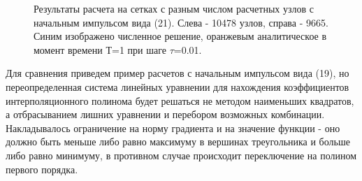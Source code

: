 \documentclass[14pt]{article}
\begin{document}
\begin{figure}[H]
\caption{Результаты расчета на сетках с разным числом расчетных узлов с начальным импульсом вида (21). Слева - 10478 узлов, справа - 9665. Синим изображено численное решение, оранжевым аналитическое в момент времени Т=1 при шаге $\tau$=0.01.}
\end{figure}
Для сравнения приведем пример расчетов с начальным импульсом вида (19), но переопределенная система линейных уравнении для нахождения коэффициентов интерполяционного полинома будет решаться не методом наименьших квадратов, а отбрасыванием лишних уравнении и перебором возможных комбинации. Накладывалось ограничение на норму градиента и на значение функции - оно должно быть меньше либо равно максимуму в вершинах треугольника и больше либо равно минимуму, в противном случае происходит переключение на полином первого порядка.
\end{document}
